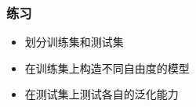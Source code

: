 \documentclass[14pt]{beamer}
\begin{document}
    \begin{frame}
        \frametitle{练习}
        \begin{itemize}
            \item 划分训练集和测试集
            \item 在训练集上构造不同自由度的模型
            \item 在测试集上测试各自的泛化能力
        \end{itemize}
    \end{frame}
\end{document}
